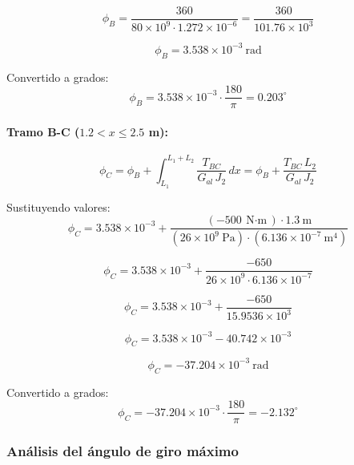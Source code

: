 \documentclass[12pt,a4paper]{article}
\begin{document}
\begin{enumerate}
\begin{equation}
\phi_B=\frac{360}{80\times 10^9 \cdot 1.272\times 10^{-6}}
=\frac{360}{101.76\times 10^3}
\end{equation}

\begin{equation}
\phi_B=3.538\times 10^{-3}\ \text{rad}
\end{equation}

Convertido a grados:
\begin{equation}
\phi_B=3.538\times 10^{-3}\cdot \frac{180}{\pi}=0.203^\circ
\end{equation}

\paragraph{Tramo B-C ($1.2 < x \leq 2.5$ m):}
\begin{equation}
\phi_C=\phi_B+\int_{L_1}^{L_1+L_2}\frac{T_{BC}}{G_{al}\,J_2}\,dx
=\phi_B+\frac{T_{BC}\,L_2}{G_{al}\,J_2}
\end{equation}

Sustituyendo valores:
\begin{equation}
\phi_C=3.538\times 10^{-3}
+\frac{(-500\ \text{N$\cdot$m})\cdot 1.3\ \text{m}}
{(26\times 10^9\ \text{Pa})\cdot (6.136\times 10^{-7}\ \text{m}^4)}
\end{equation}

\begin{equation}
\phi_C=3.538\times 10^{-3}
+\frac{-650}{26\times 10^9 \cdot 6.136\times 10^{-7}}
\end{equation}

\begin{equation}
\phi_C=3.538\times 10^{-3}
+\frac{-650}{15.9536\times 10^3}
\end{equation}

\begin{equation}
\phi_C=3.538\times 10^{-3}-40.742\times 10^{-3}
\end{equation}

\begin{equation}
\phi_C=-37.204\times 10^{-3}\ \text{rad}
\end{equation}

Convertido a grados:
\begin{equation}
\phi_C=-37.204\times 10^{-3}\cdot \frac{180}{\pi}=-2.132^\circ
\end{equation}

\subsubsection*{Análisis del ángulo de giro máximo}


\end{enumerate}
\end{document}
